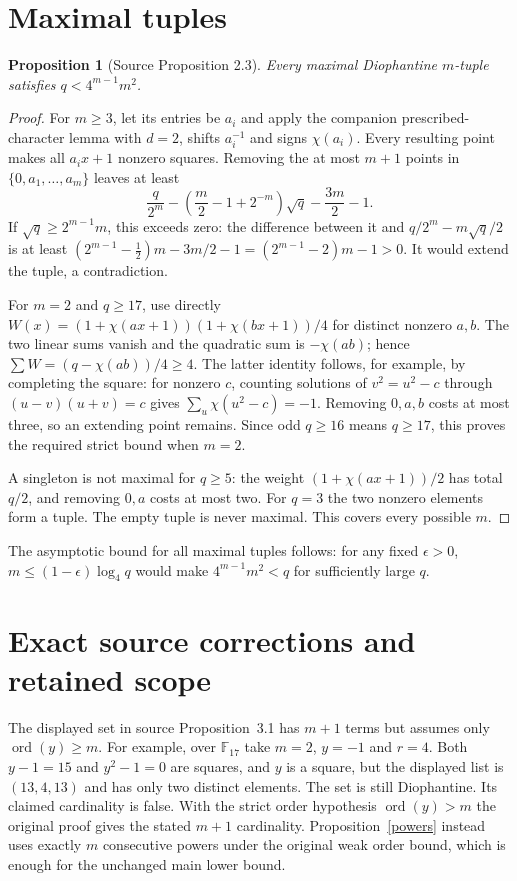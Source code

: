 \documentclass[11pt,a4paper]{article}
\newtheorem{proposition}[theorem]{Proposition}
\newcommand{\F}{\mathbb F}
\newcommand{\ord}{\operatorname{ord}}
\begin{document}
\section{Maximal tuples}
\begin{proposition}[Source Proposition 2.3]
Every maximal Diophantine $m$-tuple satisfies $q<4^{m-1}m^2$.
\end{proposition}
\begin{proof}
For $m\ge3$, let its entries be $a_i$ and apply the companion prescribed-
character lemma with $d=2$, shifts $a_i^{-1}$ and signs $\chi(a_i)$.
Every resulting point makes all $a_i x+1$ nonzero squares. Removing the
at most $m+1$ points in $\{0,a_1,\ldots,a_m\}$ leaves at least
\[
 \frac q{2^m}-\left(\frac m2-1+2^{-m}\right)\sqrt q
 -\frac{3m}2-1.
\]
If $\sqrt q\ge2^{m-1}m$, this exceeds zero: the difference between it
and $q/2^m-m\sqrt q/2$ is at least
$(2^{m-1}-\tfrac12)m-3m/2-1=(2^{m-1}-2)m-1>0$.
It would extend the tuple, a contradiction.

For $m=2$ and $q\ge17$, use directly
$W(x)=(1+\chi(ax+1))(1+\chi(bx+1))/4$ for distinct nonzero $a,b$.
The two linear sums vanish and the quadratic sum is $-\chi(ab)$;
hence $\sum W=(q-\chi(ab))/4\ge4$. The latter identity follows, for
example, by completing the square: for nonzero $c$, counting solutions
of $v^2=u^2-c$ through $(u-v)(u+v)=c$ gives
$\sum_u\chi(u^2-c)=-1$. Removing $0,a,b$ costs at most three, so an
extending point remains. Since odd $q\ge16$ means $q\ge17$, this proves
the required strict bound when $m=2$.

A singleton is not maximal for $q\ge5$: the weight
$(1+\chi(ax+1))/2$ has total $q/2$, and removing $0,a$ costs at most
two. For $q=3$ the two nonzero elements form a tuple. The empty tuple
is never maximal. This covers every possible $m$.
\end{proof}
The asymptotic bound for all maximal tuples follows: for any fixed
$\epsilon>0$, $m\le(1-\epsilon)\log_4q$ would make
$4^{m-1}m^2<q$ for sufficiently large $q$.

\section{Exact source corrections and retained scope}
The displayed set in source Proposition~3.1 has $m+1$ terms but assumes
only $\ord(y)\ge m$. For example, over $\F_{17}$ take $m=2$, $y=-1$
and $r=4$. Both $y-1=15$ and $y^2-1=0$ are squares, and $y$ is a
square, but the displayed list is $(13,4,13)$ and has only two distinct
elements. The set is still Diophantine. Its claimed cardinality is false.
With the strict order hypothesis $\ord(y)>m$ the original proof gives
the stated $m+1$ cardinality. Proposition~\ref{powers} instead uses
exactly $m$ consecutive powers under the original weak order bound,
which is enough for the unchanged main lower bound.
\end{document}
